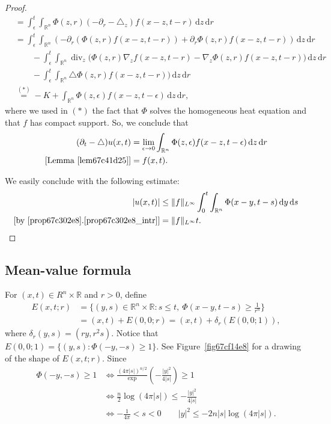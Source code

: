\documentclass[a4paper,9pt]{amsart}
\newcommand{\R}{\mathbb{R}}	%
\newcommand{\did}{\,\mathrm{d}}	%
\newcommand{\de}{\partial}		%
\renewcommand{\div}{\operatorname{div}}	%
\newcommand{\IFF}{\Leftrightarrow}	%
\newcommand{\laplacian}{\triangle}
\newcommand{\grad}{\nabla}
\theoremstyle{plain}
\theoremstyle{definition}
\theoremstyle{remark}
\begin{document}
\begin{proof}
\begin{align*}
		&= \int_\epsilon^t \int_{\R^n} \Phi(z,r) (-\de_r - \laplacian_z)f(x-z,t-r) \did z\did r \\
		&= \int_\epsilon^t \int_{\R^n} (-\de_r(\Phi(z,r)f(x-z,t-r)) + \de_r\Phi(z,r)f(x-z,t-r) ) \did z\did r \\
		&\qquad
			- \int_\epsilon^t \int_{\R^n} \div_z\Big(\Phi(z,r)\grad_zf(x-z,t-r) - \grad_z\Phi(z,r)f(x-z,t-r)\Big) \did z\did r \\
		&\qquad
			- \int_\epsilon^t \int_{\R^n} \laplacian\Phi(z,r)f(x-z,t-r)) \did z\did r \\
		&\overset{(*)}= -K + \int_{\R^n} \Phi(z,\epsilon)f(x-z,t-\epsilon) \did z\did r ,
	\end{align*}
	where we used in $(*)$ the fact that $\Phi$ solves the homogeneous heat equation and that $f$ has compact support.
	So, we conclude that
	\begin{align*}
		(\de_t - \laplacian)u(x,t)
		&= \lim_{\epsilon\to0} \int_{\R^n} \Phi(z,\epsilon)f(x-z,t-\epsilon) \did z\did r \\
		[\text{Lemma~\ref{lem67c41d25}}]
		&= f(x,t) .
	\end{align*}
	
	We easily conclude with the following estimate:
	\begin{align*}
		|u(x,t)|
		&\le \|f\|_{L^\infty} \int_0^t \int_{\R^n} \Phi(x-y,t-s) \did y\did s \\
		\text{[by~\ref{prop67c302e8}.\ref{prop67c302e8_intr}]}&= \|f\|_{L^\infty} t .
	\end{align*}
\end{proof}

\subsection{Mean-value formula}\label{subs67c44996}
For $(x,t)\in R^n\times\R$ and $r>0$, define
\begin{equation}\label{eq67ceb710}
\begin{aligned}
	E(x,t;r)
	&= \{(y,s) \in \R^n\times\R : s\le t,\ \Phi(x-y,t-s) \ge \frac1{r^n} \} \\
	&= (x,t) + E(0,0;r)
	= (x,t) + \delta_r(E(0,0;1)) ,
\end{aligned}
\end{equation}
where $\delta_r(y,s) = (ry,r^2 s)$.
Notice that $E(0,0;1) = \{(y,s): \Phi(-y,-s) \ge 1\}$.
See Figure~\ref{fig67cf14e8} for a drawing of the shape of $E(x,t;r)$.
Since
\begin{align}
	\Phi(-y,-s) \ge 1
	&\IFF \frac{(4\pi|s|)^{n/2}} \exp\left(-\frac{|y|^2}{4|s|}\right) \ge 1 \\
	&\IFF \frac{n}{2} \log(4\pi|s|) \le -\frac{|y|^2}{4|s|} \\
	&\IFF -\frac{1}{4\pi} < s < 0 \qquad |y|^2 \le - 2n |s| \log(4\pi|s|) .
\end{align}
\end{document}
